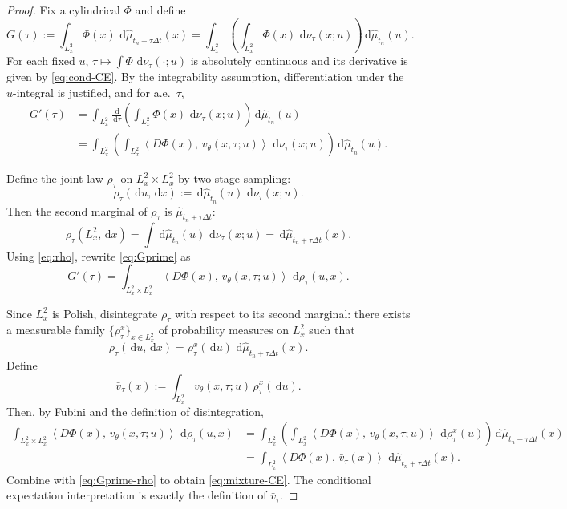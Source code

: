 \documentclass{article}
\numberwithin{equation}{section}
\theoremstyle{plain}
\theoremstyle{definition}
\theoremstyle{remark}
\newcommand{\dd}{\,\mathrm{d}}
\newcommand{\ip}[2]{\left\langle #1,\,#2 \right\rangle}
\begin{document}
\begin{proof}
Fix a cylindrical $\Phi$ and define
\[
G(\tau):=\int_{L^2_x}\Phi(x)\,\dd\widehat\mu_{t_n+\tau\Delta t}(x)
=
\int_{L^2_x}\left(\int_{L^2_x}\Phi(x)\,\dd\nu_\tau(x;u)\right)\dd\widehat\mu_{t_n}(u).
\]
For each fixed $u$, $\tau\mapsto \int\Phi\,\dd\nu_\tau(\cdot;u)$ is absolutely continuous and its derivative is given by
\eqref{eq:cond-CE}. By the integrability assumption, differentiation under the $u$-integral is justified, and for a.e.\ $\tau$,
\begin{align}
G'(\tau)
&=
\int_{L^2_x}\frac{\dd}{\dd\tau}\left(\int_{L^2_x}\Phi(x)\,\dd\nu_\tau(x;u)\right)\dd\widehat\mu_{t_n}(u)\nonumber\\
&=
\int_{L^2_x}\left(\int_{L^2_x}\ip{D\Phi(x)}{v_\theta(x,\tau;u)}\,\dd\nu_\tau(x;u)\right)\dd\widehat\mu_{t_n}(u).
\label{eq:Gprime}
\end{align}

Define the joint law $\rho_\tau$ on $L^2_x\times L^2_x$ by two-stage sampling:
\begin{equation}\label{eq:rho}
\rho_\tau(\dd u,\dd x):=\dd\widehat\mu_{t_n}(u)\,\dd\nu_\tau(x;u).
\end{equation}
Then the second marginal of $\rho_\tau$ is $\widehat\mu_{t_n+\tau\Delta t}$:
\[
\rho_\tau(L^2_x,\dd x)=\int \dd\widehat\mu_{t_n}(u)\,\dd\nu_\tau(x;u)=\dd\widehat\mu_{t_n+\tau\Delta t}(x).
\]
Using \eqref{eq:rho}, rewrite \eqref{eq:Gprime} as
\begin{equation}\label{eq:Gprime-rho}
G'(\tau)=\int_{L^2_x\times L^2_x}\ip{D\Phi(x)}{v_\theta(x,\tau;u)}\,\dd\rho_\tau(u,x).
\end{equation}

Since $L^2_x$ is Polish, disintegrate $\rho_\tau$ with respect to its second marginal:
there exists a measurable family $\{\rho_\tau^x\}_{x\in L^2_x}$ of probability measures on $L^2_x$ such that
\[
\rho_\tau(\dd u,\dd x)=\rho_\tau^x(\dd u)\,\dd\widehat\mu_{t_n+\tau\Delta t}(x).
\]
Define
\[
\bar v_\tau(x):=\int_{L^2_x} v_\theta(x,\tau;u)\,\rho_\tau^x(\dd u).
\]
Then, by Fubini and the definition of disintegration,
\begin{align*}
\int_{L^2_x\times L^2_x}\ip{D\Phi(x)}{v_\theta(x,\tau;u)}\,\dd\rho_\tau(u,x)
&=\int_{L^2_x}\left(\int_{L^2_x}\ip{D\Phi(x)}{v_\theta(x,\tau;u)}\,\dd\rho_\tau^x(u)\right)\dd\widehat\mu_{t_n+\tau\Delta t}(x)\\
&=\int_{L^2_x}\ip{D\Phi(x)}{\bar v_\tau(x)}\,\dd\widehat\mu_{t_n+\tau\Delta t}(x).
\end{align*}
Combine with \eqref{eq:Gprime-rho} to obtain \eqref{eq:mixture-CE}.
The conditional expectation interpretation is exactly the definition of $\bar v_\tau$.
\end{proof}
\end{document}
